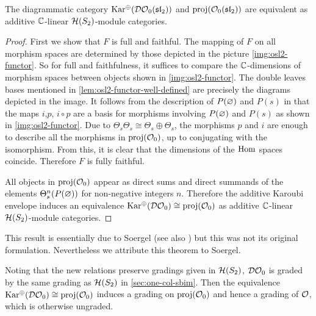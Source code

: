 \begin{theorem}
    The diagrammatic category $\operatorname{Kar^\oplus}(\mathcal{DO}_0(\operatorname{\mathfrak{sl}}_2))$ and $\operatorname{proj}(\mathcal{O}_0(\operatorname{\mathfrak{sl}}_2))$ are equivalent as additive $\mathbb{C}$-linear $\mathcal{H}(S_2)$-module categories.
\end{theorem}

\begin{proof}
    First we show that $F$ is full and faithful. The mapping of $F$ on all morphism spaces are determined by those depicted in the picture \eqref{img:osl2-functor}. So for full and faithfulness, it suffices to compare the $\mathbb{C}$-dimensions of morphism spaces between objects shown in \eqref{img:osl2-functor}. The double leaves bases mentioned in \autoref{lem:osl2-functor-well-defined} are precisely the diagrams depicted in the image. It follows from the description of $P(\varnothing)$ and $P(s)$ in \cite[Section 5.2]{mazorchuk-lectures-sl2-modules} that the maps $i$,$p$, $i \circ p$ are a basis for morphisms involving $P(\varnothing)$ and $P(s)$ as shown in \eqref{img:osl2-functor}. Due to $\Theta_s \Theta_s \cong \Theta_s \oplus \Theta_s$, the morphisms $p$ and $i$ are enough to describe all the morphisms in $\operatorname{proj}(\mathcal{O}_0)$, up to conjugating with the isomorphism. From this, it is clear that the dimensions of the $\operatorname{Hom}$ spaces coincide. Therefore $F$ is fully faithful.


    All objects in $\operatorname{proj}(\mathcal{O}_0)$ appear as direct sums and direct summands of the elements $\Theta_s^n(P(\varnothing))$ for non-negative integers $n$. Therefore the additive Karoubi envelope induces an equivalence $\operatorname{Kar^\oplus}(\mathcal{DO}_0) \cong \operatorname{proj}(\mathcal{O}_0)$ as additive $\mathbb{C}$-linear $\mathcal{H}(S_2)$-module categories.
\end{proof}


This result is essentially due to Soergel \cite[Endomorhihsmensatz 7, Struktursatz 9 and Section 2.4]{soergel-category-O} (see also \cite{soergel-combinatorics-of-hcbim}) but this was not its original formulation. Nevertheless we attribute this theorem to Soergel.

\begin{remark}
    Noting that the new relations preserve gradings given in $\mathcal{H}(S_2)$, $\mathcal{DO}_0$ is graded by the same grading as $\mathcal{H}(S_2)$ in \autoref{sec:one-col-sbim}. Then the equivalence $\operatorname{Kar^\oplus}(\mathcal{DO}_0) \cong \operatorname{proj}(\mathcal{O}_0)$ induces a grading on $\operatorname{proj}(\mathcal{O}_0)$ and hence a grading of $\mathcal{O}$, which is otherwise ungraded.
\end{remark}

